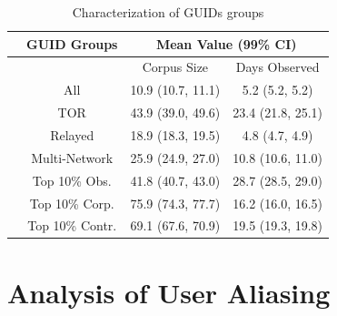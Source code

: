 \documentclass[notes]{beamer}
\begin{document}
\begin{frame}

\begin{block}

\begin{table} 

\centering

\caption{Characterization of GUIDs groups} 
\label{tab:table4}
\begin{tabular}{c|ccc}\hline & \multicolumn{1}{c}{GUID Groups} & \multicolumn{2}{c}{Mean Value (99\% CI)} \\

\hline 
& & Corpus Size & Days Observed \\ 

\hline
\hline
\parbox[t]{2mm}{} & All & 10.9 (10.7, 11.1) & 5.2 (5.2, 5.2) \\
& TOR & 43.9 (39.0, 49.6) & 23.4 (21.8, 25.1)\\
& Relayed & 18.9 (18.3, 19.5) & 4.8 (4.7, 4.9)\\
& Multi-Network & 25.9 (24.9, 27.0) & 10.8 (10.6, 11.0)\\
& Top 10\% Obs. & 41.8 (40.7, 43.0) & 28.7 (28.5, 29.0)\\
& Top 10\% Corp. & 75.9 (74.3, 77.7) & 16.2 (16.0, 16.5)\\
& Top 10\% Contr. & 69.1 (67.6, 70.9) & 19.5 (19.3, 19.8)\\
\hline

\end{tabular}


\end{table}

\end{block}

\end{frame}

\section{Analysis of User Aliasing}
\begin{frame}

\end{frame}
\end{document}
